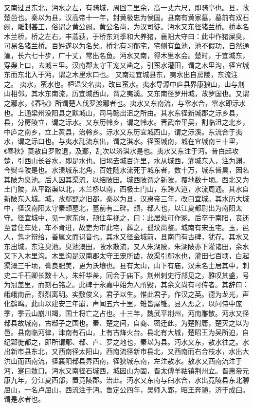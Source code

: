 \documentclass[12pt,UTF8]{ctexbook}
\begin{document}
又南过县东北，沔水之左，有骑城，周回二里余，高一丈六尺，即骑亭也。县，故楚邑也。秦以为县，汉高帝十一年，封黄极忠为侯国。县南有黄家墓，墓前有双石阙，雕制甚工，俗谓之黄公阙。黄公名尚，为汉司徒。沔水又东径猪兰桥。桥本名木兰桥，桥之左右，丰蒿荻，于桥东刘季和大养猪，襄阳大守曰：此中作猪屎臭，可易名猪兰桥。百姓遂以为名矣。桥北有习郁宅，宅侧有鱼池，池不假功，自然通洫，长六七十步，广十丈，常出名鱼。沔水又南，得木里水会。楚时，于宜城东，穿渠上口，去城三里。汉南郡太守王宠又凿之，引蛮水灌田，谓之木里沟，径宜城东而东北入于沔，谓之木里水口也。
又南过宜城县东，夷水出自房陵，东流注之。
夷水，蛮水也。桓温父名夷，改曰蛮水。夷水导源中庐县界康狼山，山与荆山相邻。其水东南流，历宜城西山，谓之夷溪。又东南径罗卅城，故罗国也。又谓之鄢水，《春秋》所谓楚人伐罗渡鄢者也。夷水又东南流，与零水合，零水即沶水也。上通梁州没阳县之默城山，司马懿出沮之所由。其水东径新城郡之沶乡县，县，分房陵立，谓之沶水。又东历軨乡，谓之軨水。晋武帝平吴，割临沮之北乡，中庐之南乡，立上黄县，治軨乡。沶水又东历宜城西山，谓之沶溪。东流合于夷水，谓之沶口也。与夷水乱流东出，谓之淇水。径蛮城南，城在宜城南三十里，《春秋》莫敖自罗败退，及鄢，乱次以济淇水是也。夷水又东注于沔。昔白起攻楚，引西山长谷水，即是水也。旧堨去城百许里，水从城西，灌城东入，注为渊，今熨斗陂是也。水溃城东北角，百姓随水流死于城东者，数十万，城东皆臭，因名其陂为臭池。后人因其渠流，以结陂田。城西陂谓之新陂，覆地数十顷。西北又为土门陂，从平路渠以北，木兰桥以南，西极土门山，东跨大道，水流周通。其水自新陂东入城。城，故鄢郢之旧都，秦以为县，汉惠帝三年，改曰宜城。其水历大城中，径汉南阳太守秦颉墓北，墓前有二碑。颉，鄀人也，以江夏都尉出为南阳太守。径宜城中，见一家东向，颉住车视之，曰：此居处可作冢。后卒于南阳，丧还至昔住车处，车不肯进，故吏为市此宅，葬之，孤坟尚整。城南有宋玉宅。玉，邑人，隽才辩给，善属文而识音也。其水又径金城前，县南门有古碑，犹存。其水又东出城，东注臭池。臭池溉田，陂水散流，又人朱湖陂，朱湖陂亦下灌诸田，余水又下入木里沟。木里沟是汉南郡太守王宠所凿，故渠引鄢水也，灌田七百顷，白起渠溉三千顷，膏良肥美，更为沃壤也。县有太山，山下有庙，汉末名士居其中，刺史二千石卿长数十人，朱轩华盖，同会于庙下。荆州刺史行部见之，雅叹其盛，号为冠盖里，而刻石铭之。此碑于永嘉中始为人所毁，其余文尚有可传者。其辞曰：峨峨南岳，烈烈离明。实敷俊义，君子以生。惟此君子，作汉之英。德为龙光，声化鹤鸣。此山以建安三年崩，声闻五六十里，雉皆屋雊。县人恶之，以问侍中庞季，季云山崩川竭，国土将亡之占也。十三年，魏武平荆州，沔南雕散。沔水又径鄀县故城南，古鄀子之国也。秦、楚之间，自商、密迁此，为楚附庸，楚灭之以为邑。县南临沔律，津南有石山，上有古烽火台。县北有大城，楚昭王为吴所迫，自纪郢徙都之，即所谓鄢、鄀、卢、罗之地也，秦以为县。沔水又东，敖水往之。水出新市县东北，又西南径太阳山，西南流径新市县北，又西南而右合枝水，水出大洪山而西南流，径襄阳鄀县界西南，径狄城东南，左注敖水。敖水又西南流注于沔，寔曰敖口。沔水又南径石城西，城因山为固，晋太傅羊祜镇荆州立。晋惠帝元康九年，分江夏西部，置竟陵郡。治此。沔水又东南与臼水合，水出竟陵县东北聊屈山，一名卢屈山，西流注于沔。鲁定公四年，吴师入郢，昭王奔随，济于成臼。谓是水者也。
\end{document}

